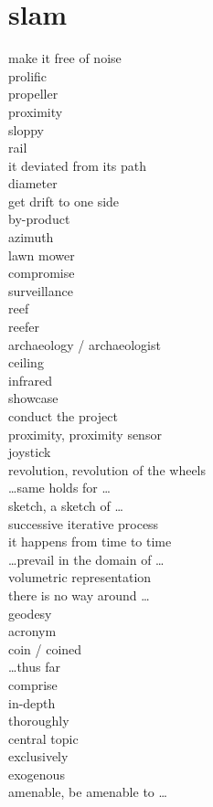 \documentclass[12pt]{article}
\begin{document}
\section{slam}
make it free of noise \\
prolific \\
propeller \\
proximity \\
sloppy \\
rail \\
it deviated from its path \\
diameter \\
get drift to one side \\
by-product \\
azimuth \\
lawn mower \\
compromise \\
surveillance \\
reef \\
reefer \\
archaeology / archaeologist \\
ceiling \\
infrared \\
showcase \\
conduct the project \\
proximity, proximity sensor \\
joystick \\
revolution, revolution of the wheels \\
\dots same holds for \dots \\
sketch, a sketch of \dots \\
successive iterative process \\
it happens from time to time \\
\dots prevail in the domain of \dots \\
volumetric representation \\
there is no way around \dots \\
geodesy \\
acronym \\
coin / coined \\
\dots thus far \\
comprise \\
in-depth \\
thoroughly \\
central topic \\
exclusively \\
exogenous \\
amenable, be amenable to \dots \\
\end{document}
